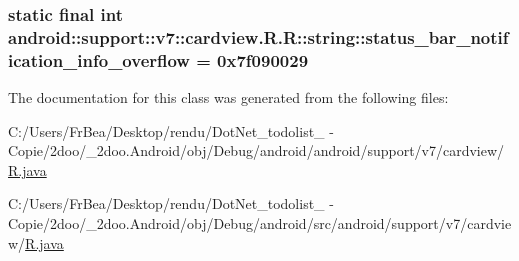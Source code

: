 \hypertarget{classandroid_1_1support_1_1v7_1_1cardview_1_1_r_1_1string_ee502100c12fc09c1582b3a619542961}{
\subsubsection[{status\_\-bar\_\-notification\_\-info\_\-overflow}]{\setlength{\rightskip}{0pt plus 5cm}static final int android::support::v7::cardview.R.R::string::status\_\-bar\_\-notification\_\-info\_\-overflow = 0x7f090029}}
\label{classandroid_1_1support_1_1v7_1_1cardview_1_1_r_1_1string_ee502100c12fc09c1582b3a619542961}




The documentation for this class was generated from the following files:\begin{CompactItemize}
\item 
C:/Users/FrBea/Desktop/rendu/DotNet\_\-todolist\_ - Copie/2doo/\_\-2doo.Android/obj/Debug/android/android/support/v7/cardview/\hyperlink{android_2support_2v7_2cardview_2_r_8java}{R.java}\item 
C:/Users/FrBea/Desktop/rendu/DotNet\_\-todolist\_ - Copie/2doo/\_\-2doo.Android/obj/Debug/android/src/android/support/v7/cardview/\hyperlink{src_2android_2support_2v7_2cardview_2_r_8java}{R.java}\end{CompactItemize}
